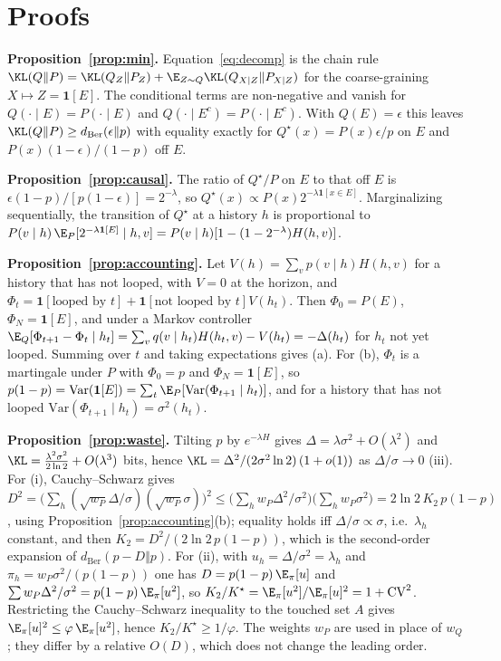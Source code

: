 \section{Proofs}\label{app:proofs}

\textbf{Proposition~\ref{prop:min}.} Equation~\eqref{eq:decomp} is the chain rule $\KL(Q\Vert P)=\KL(Q_Z\Vert P_Z)+\E_{Z\sim Q}\KL(Q_{X|Z}\Vert P_{X|Z})$ for the coarse-graining $X\mapsto Z=\mathbf{1}[E]$. The conditional terms are non-negative and vanish for $Q(\cdot\mid E)=P(\cdot\mid E)$ and $Q(\cdot\mid E^c)=P(\cdot\mid E^c)$. With $Q(E)=\epsilon$ this leaves $\KL(Q\Vert P)\ge d_{\mathrm{Ber}}(\epsilon\Vert p)$ with equality exactly for $Q^\star(x)=P(x)\epsilon/p$ on $E$ and $P(x)(1-\epsilon)/(1-p)$ off $E$.

\textbf{Proposition~\ref{prop:causal}.} The ratio of $Q^\star/P$ on $E$ to that off $E$ is $\epsilon(1-p)/[p(1-\epsilon)]=2^{-\lambda}$, so $Q^\star(x)\propto P(x)2^{-\lambda\mathbf{1}[x\in E]}$. Marginalizing sequentially, the transition of $Q^\star$ at a history $h$ is proportional to $P(v\mid h)\,\E_P[2^{-\lambda\mathbf{1}[E]}\mid h,v]=P(v\mid h)[1-(1-2^{-\lambda})H(h,v)]$.

\textbf{Proposition~\ref{prop:accounting}.} Let $V(h)=\sum_vp(v\mid h)H(h,v)$ for a history that has not looped, with $V=0$ at the horizon, and $\Phi_t=\mathbf{1}[\text{looped by }t]+\mathbf{1}[\text{not looped by }t]V(h_t)$. Then $\Phi_0=P(E)$, $\Phi_N=\mathbf{1}[E]$, and under a Markov controller $\E_Q[\Phi_{t+1}-\Phi_t\mid h_t]=\sum_vq(v\mid h_t)H(h_t,v)-V(h_t)=-\Delta(h_t)$ for $h_t$ not yet looped. Summing over $t$ and taking expectations gives (a). For (b), $\Phi_t$ is a martingale under $P$ with $\Phi_0=p$ and $\Phi_N=\mathbf{1}[E]$, so $p(1-p)=\mathrm{Var}(\mathbf{1}[E])=\sum_t\E_P[\mathrm{Var}(\Phi_{t+1}\mid h_t)]$, and for a history that has not looped $\mathrm{Var}(\Phi_{t+1}\mid h_t)=\sigma^2(h_t)$.

\textbf{Proposition~\ref{prop:waste}.} Tilting $p$ by $e^{-\lambda H}$ gives $\Delta=\lambda\sigma^2+O(\lambda^2)$ and $\KL=\frac{\lambda^2\sigma^2}{2\ln2}+O(\lambda^3)$ bits, hence $\KL=\Delta^2/(2\sigma^2\ln2)\,(1+o(1))$ as $\Delta/\sigma\to0$ (iii). For (i), Cauchy--Schwarz gives $D^2=\big(\sum_h(\sqrt{w_P}\Delta/\sigma)(\sqrt{w_P}\sigma)\big)^2\le\big(\sum_hw_P\Delta^2/\sigma^2\big)\big(\sum_hw_P\sigma^2\big)=2\ln2\,K_2\,p(1-p)$, using Proposition~\ref{prop:accounting}(b); equality holds iff $\Delta/\sigma\propto\sigma$, i.e.\ $\lambda_h$ constant, and then $K_2=D^2/(2\ln2\,p(1-p))$, which is the second-order expansion of $d_{\mathrm{Ber}}(p-D\Vert p)$. For (ii), with $u_h=\Delta/\sigma^2=\lambda_h$ and $\pi_h=w_P\sigma^2/(p(1-p))$ one has $D=p(1-p)\,\E_\pi[u]$ and $\sum w_P\Delta^2/\sigma^2=p(1-p)\,\E_\pi[u^2]$, so $K_2/K^\star=\E_\pi[u^2]/\E_\pi[u]^2=1+\mathrm{CV}^2$. Restricting the Cauchy--Schwarz inequality to the touched set $A$ gives $\E_\pi[u]^2\le\varphi\,\E_\pi[u^2]$, hence $K_2/K^\star\ge1/\varphi$. The weights $w_P$ are used in place of $w_Q$; they differ by a relative $O(D)$, which does not change the leading order.
